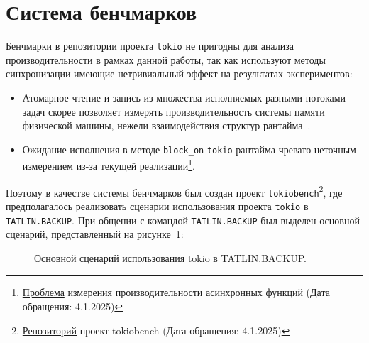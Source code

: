 
\section{Система бенчмарков}

Бенчмарки в репозитории проекта \verb|tokio| не пригодны для анализа производительности в рамках данной работы, так как используют методы синхронизации имеющие нетривиальный эффект на результатах экспериментов:

\begin{itemize}
    \item Атомарное чтение и запись из множества исполняемых разными потоками задач скорее позволяет измерять производительность системы памяти физической машины, нежели взаимодействия структур рантайма~\cite{atomicOnModerHardware}.
    \item Ожидание исполнения в методе \verb|block_on| \verb|tokio| рантайма чревато неточным измерением из-за текущей реализации\footnote{\href{https://github.com/bheisler/criterion.rs/issues/819}{Проблема} измерения производительности асинхронных функций (Дата обращения: 4.1.2025)}.
\end{itemize}

Поэтому в качестве системы бенчмарков был создан проект \verb|tokiobench|\footnote{\href{https://github.com/IgorErin/tokiobench}{Репозиторий} проект tokiobench (Дата обращения: 4.1.2025)}, где предполагалось реализовать сценарии использования проекта \verb|tokio| в \verb|TATLIN.BACKUP|. При общении с командой \verb|TATLIN.BACKUP| был выделен основной сценарий, представленный на рисунке~\ref{fig:scenario}:

\begin{figure}[H]
    \begin{center}
    \end{center}

    \caption{Основной сценарий использования tokio в TATLIN.BACKUP.}
    \label{fig:scenario}
\end{figure}


